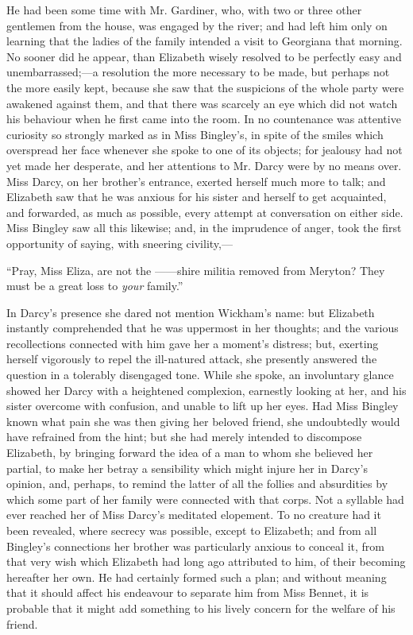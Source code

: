 He had been some time with Mr. Gardiner, who, with two or three other gentlemen from the house, was engaged by the river; and had left him only on learning that the ladies of the family intended a visit to Georgiana that morning. No sooner did he appear, than Elizabeth wisely resolved to be perfectly easy and unembarrassed;---a resolution the more necessary to be made, but perhaps not the more easily kept, because she saw that the suspicions of the whole party were awakened against them, and that there was scarcely an eye which did not watch his behaviour when he first came into the room. In no countenance was attentive curiosity so strongly marked as in Miss Bingley's, in spite of the smiles which overspread her face whenever she spoke to one of its objects; for jealousy had not yet made her desperate, and her attentions to Mr. Darcy were by no means over. Miss Darcy, on her brother's entrance, exerted herself much more to talk; and Elizabeth saw that he was anxious for his sister and herself to get acquainted, and forwarded, as much as possible, every attempt at conversation on either side. Miss Bingley saw all this likewise; and, in the imprudence of anger, took the first opportunity of saying, with sneering civility,---

``Pray, Miss Eliza, are not the ------shire militia removed from Meryton? They must be a great loss to \textit{your} family.''

In Darcy's presence she dared not mention Wickham's name: but Elizabeth instantly comprehended that he was uppermost in her thoughts; and the various recollections connected with him gave her a moment's distress; but, exerting herself vigorously to repel the ill-natured attack, she presently answered the question in a tolerably disengaged tone. While she spoke, an involuntary glance showed her Darcy with a heightened complexion, earnestly looking at her, and his sister overcome with confusion, and unable to lift up her eyes. Had Miss Bingley known what pain she was then giving her beloved friend, she undoubtedly would have refrained from the hint; but she had merely intended to discompose Elizabeth, by bringing forward the idea of a man to whom she believed her partial, to make her betray a sensibility which might injure her in Darcy's opinion, and, perhaps, to remind the latter of all the follies and absurdities by which some part of her family were connected with that corps. Not a syllable had ever reached her of Miss Darcy's meditated elopement. To no creature had it been revealed, where secrecy was possible, except to Elizabeth; and from all Bingley's connections her brother was particularly anxious to conceal it, from that very wish which Elizabeth had long ago attributed to him, of their becoming hereafter her own. He had certainly formed such a plan; and without meaning that it should affect his endeavour to separate him from Miss Bennet, it is probable that it might add something to his lively concern for the welfare of his friend.

